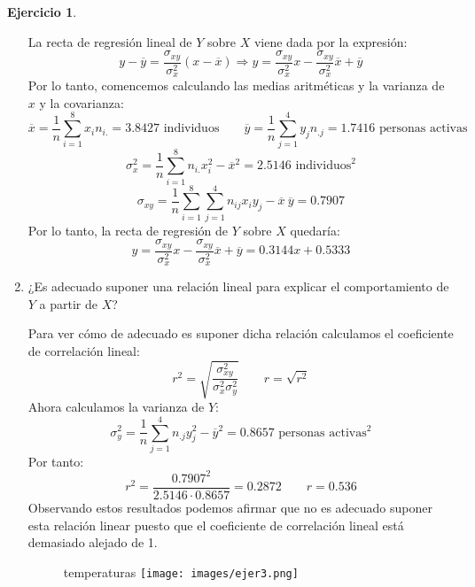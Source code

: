 \documentclass[a4paper, 12pt]{article}
\theoremstyle{definition}
\newtheorem{ej}{Ejercicio}
\begin{document}
\begin{ej}
\begin{enumerate}[label=\alph*)]
La recta de regresión lineal de \(Y\) sobre \(X\) viene dada por la expresión:
\[
	y - \overline{y}  =\frac{\sigma_{xy}}{\sigma_x^2} (x - \overline{x}) \Rightarrow y = \frac{\sigma_{xy}}{\sigma_x^2}x - \frac{\sigma_{xy}}{\sigma_x^2} \overline{x} + \overline{y}
\]
Por lo tanto, comencemos calculando las medias aritméticas y la varianza de \(x\) y la covarianza:
\[
	\overline{x} = \frac{1}{n} \sum_{i=1}^{8} x_i n_{i.} = 3.8427 \text{ individuos} \qquad \overline{y} = \frac{1}{n} \sum_{j=1}^{4} y_j n_{.j} = 1.7416 \text{ personas activas}
\]
\[
	\sigma_x^2 = \frac{1}{n} \sum_{i=1}^{8} n_{i.} x_i^2 - \overline{x}^2 = 2.5146 \text{ individuos}^2
\]
\[
	\sigma_{xy} = \frac{1}{n} \sum_{i=1}^{8} \sum_{j=1}^{4} n_{ij} x_i y_j - \overline{x}\ \overline{y} = 0.7907
\]
Por lo tanto, la recta de regresión de \(Y\) sobre \(X\) quedaría:
\[
	y = \frac{\sigma_{xy}}{\sigma_x^2}x - \frac{\sigma_{xy}}{\sigma_x^2} \overline{x} + \overline{y} = 0.3144x + 0.5333
\]

	\item ¿Es adecuado suponer una relación lineal para explicar el comportamiento de \(Y\) a partir de \(X\)?
	
Para ver cómo de adecuado es suponer dicha relación calculamos el coeficiente de correlación lineal:
\[
	r^2 = \sqrt{\frac{\sigma_{xy}^2}{\sigma_x^2 \sigma_y^2}} \qquad r = \sqrt{r^2}
\]
Ahora calculamos la varianza de \(Y\):
\[
	\sigma_y^2 = \frac{1}{n} \sum_{j=1}^{4} n_{.j} y_j^2 - \overline{y}^2 = 0.8657 \text{ personas activas}^2
\]
Por tanto:
\[
	r^2 = \frac{0.7907^2}{2.5146 \cdot 0.8657} = 0.2872 \qquad r = 0.536
\]
Observando estos resultados podemos afirmar que no es adecuado suponer esta relación linear puesto que el coeficiente de correlación lineal está demasiado alejado de 1.

\begin{figure}[h!]
	\centering
temperaturas	\texttt{[image: images/ejer3.png]}
\end{figure}

\end{enumerate}

\end{ej}
\end{document}
